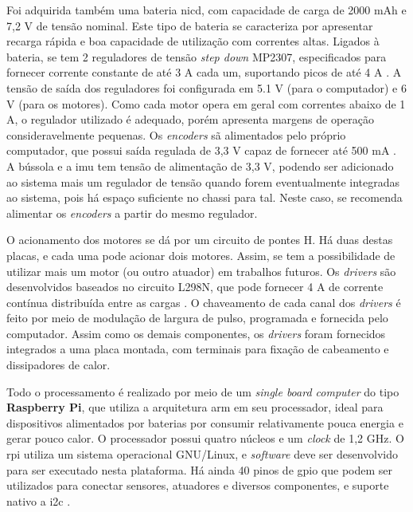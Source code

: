 Foi adquirida também uma bateria \acrshort{nicd}, com capacidade de carga de 2000 mAh e 7,2 V de tensão nominal. Este tipo de bateria se caracteriza por apresentar recarga rápida e boa capacidade de utilização com correntes altas. Ligados à bateria, se tem 2 reguladores de tensão \textit{step down} MP2307, especificados para fornecer corrente constante de até 3 A cada um, suportando picos de até 4 A \citep{MP2307}. A tensão de saída dos reguladores foi configurada em 5.1 V (para o computador) e 6 V (para os motores). Como cada motor opera em geral com correntes abaixo de 1 A, o regulador utilizado é adequado, porém apresenta margens de operação consideravelmente pequenas. Os \textit{encoders} sã alimentados pelo próprio computador, que possui saída regulada de 3,3 V capaz de fornecer até 500 mA \citep{upton2014raspberry}. A bússola e a \acrshort{imu} tem tensão de alimentação de 3,3 V, podendo ser adicionado ao sistema mais um regulador de tensão quando forem eventualmente integradas ao sistema, pois há espaço suficiente no chassi para tal. Neste caso, se recomenda alimentar os \textit{encoders} a partir do mesmo regulador.

O acionamento dos motores se dá por um circuito de pontes H. Há duas destas placas, e cada uma pode acionar dois motores. Assim, se tem a possibilidade de utilizar mais um motor (ou outro atuador) em trabalhos futuros. Os \textit{drivers} são desenvolvidos baseados no circuito L298N, que pode fornecer 4 A de corrente contínua distribuída entre as cargas \citep{L298N}. O chaveamento de cada canal dos \textit{drivers} é feito por meio de modulação de largura de pulso, programada e fornecida pelo computador. Assim como os demais componentes, os \textit{drivers} foram fornecidos integrados a uma placa montada, com terminais para fixação de cabeamento e dissipadores de calor.

Todo o processamento é realizado por meio de um \emph{single board computer} do tipo \textbf{Raspberry Pi}, que utiliza a arquitetura \acrshort{arm} em seu processador, ideal para dispositivos alimentados por baterias por consumir relativamente pouca energia e gerar pouco calor. O processador possui quatro núcleos e um \emph{clock} de 1,2 GHz. O \acrshort{rpi} utiliza um sistema operacional GNU/Linux, e \emph{software} deve ser desenvolvido para ser executado nesta plataforma. Há ainda 40 pinos de \acrlong{gpio} que podem ser utilizados para conectar sensores, atuadores e diversos componentes, e suporte nativo a \acrshort{i2c} \citep{upton2014raspberry}.

